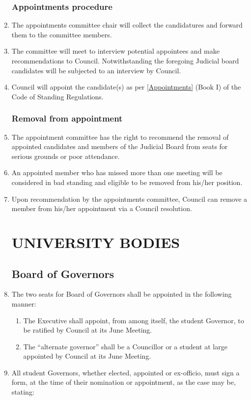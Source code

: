 \documentclass[oneside]{book}
\begin{document}
\begin{enumerate}
\section{\label{Appointments_procedure}Appointments procedure }
\item The appointments committee chair will collect the candidatures and
forward them to the committee members. 
\item The committee will meet to interview potential appointees and make
recommendations to Council. Notwithstanding the foregoing Judicial
board candidates will be subjected to an interview by Council. 
\item Council will appoint the candidate(s) as per \autoref{Appointments} (Book I) of the Code
of Standing Regulations. 

\section{\label{Removal_from_appointment}Removal from appointment }
\item The appointment committee has the right to recommend the removal of
appointed candidates and members of the Judicial Board from seats
for serious grounds or poor attendance. 
\item An appointed member who has missed more than one meeting will be considered
in bad standing and eligible to be removed from his/her position. 
\item Upon recommendation by the appointments committee, Council can remove
a member from his/her appointment via a Council resolution. 

\part{\label{UNIVERSITY_BODIES}UNIVERSITY BODIES}
\chapter{\label{Board_of_Governors}Board of Governors }
\item \label{bog_composition} The two seats for Board of Governors shall be appointed in the following
manner: 

\begin{enumerate}
\item The Executive shall appoint, from among itself, the student Governor,
to be ratified by Council at its June Meeting. 
\item The ``alternate governor'' shall be a Councillor or a student
at large appointed by Council at its June Meeting. 
\end{enumerate}
\item All student Governors, whether elected, appointed or ex-officio, must
sign a form, at the time of their nomination or appointment, as the
case may be, stating: 


\end{enumerate}
\end{document}

